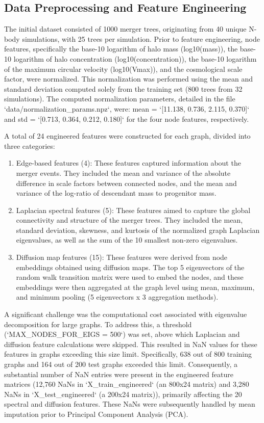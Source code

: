 \documentclass[twocolumn]{aastex631}
\begin{document}
\subsection{Data Preprocessing and Feature Engineering}

The initial dataset consisted of 1000 merger trees, originating from 40 unique N-body simulations, with 25 trees per simulation. Prior to feature engineering, node features, specifically the base-10 logarithm of halo mass (log10(mass)), the base-10 logarithm of halo concentration (log10(concentration)), the base-10 logarithm of the maximum circular velocity (log10(Vmax)), and the cosmological scale factor, were normalized. This normalization was performed using the mean and standard deviation computed solely from the training set (800 trees from 32 simulations). The computed normalization parameters, detailed in the file `data/normalization\_params.npz`, were: mean = `[11.138, 0.736, 2.115, 0.370]` and std = `[0.713, 0.364, 0.212, 0.180]` for the four node features, respectively.

A total of 24 engineered features were constructed for each graph, divided into three categories:
\begin{enumerate}
    \item Edge-based features (4): These features captured information about the merger events. They included the mean and variance of the absolute difference in scale factors between connected nodes, and the mean and variance of the log-ratio of descendant mass to progenitor mass.
    \item Laplacian spectral features (5): These features aimed to capture the global connectivity and structure of the merger trees. They included the mean, standard deviation, skewness, and kurtosis of the normalized graph Laplacian eigenvalues, as well as the sum of the 10 smallest non-zero eigenvalues.
    \item Diffusion map features (15): These features were derived from node embeddings obtained using diffusion maps. The top 5 eigenvectors of the random walk transition matrix were used to embed the nodes, and these embeddings were then aggregated at the graph level using mean, maximum, and minimum pooling (5 eigenvectors x 3 aggregation methods).
\end{enumerate}

A significant challenge was the computational cost associated with eigenvalue decomposition for large graphs. To address this, a threshold (`MAX\_NODES\_FOR\_EIGS = 500`) was set, above which Laplacian and diffusion feature calculations were skipped. This resulted in NaN values for these features in graphs exceeding this size limit. Specifically, 638 out of 800 training graphs and 164 out of 200 test graphs exceeded this limit. Consequently, a substantial number of NaN entries were present in the engineered feature matrices (12,760 NaNs in `X\_train\_engineered` (an 800x24 matrix) and 3,280 NaNs in `X\_test\_engineered` (a 200x24 matrix)), primarily affecting the 20 spectral and diffusion features. These NaNs were subsequently handled by mean imputation prior to Principal Component Analysis (PCA).
\end{document}
